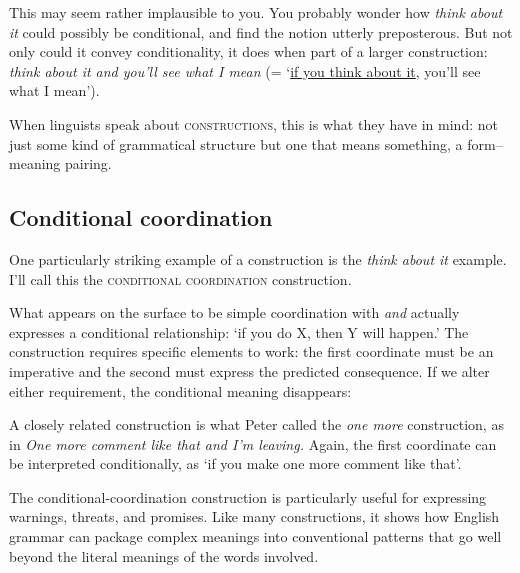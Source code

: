 This may seem rather implausible to you. You probably wonder how \textit{think about it} could possibly be conditional, and find the notion utterly preposterous. But not only could it convey conditionality, it does when part of a larger construction: \textit{think about it and you'll see what I mean} (= `\uline{if you think about it}, you'll see what I mean').

When linguists speak about \textsc{constructions}, this is what they have in mind: not just some kind of grammatical structure but one that means something, a form--meaning pairing.

\subsection{Conditional coordination}\label{sec:conditional-coordination}

One particularly striking example of a construction is the \textit{think about it} example. I'll call this the \textsc{conditional coordination} construction.

\ea\label{ex:conditional-coord}
   \z
\z

What appears on the surface to be simple coordination with \textit{and} actually expresses a conditional relationship: `if you do X, then Y will happen.' The construction requires specific elements to work: the first coordinate must be an imperative and the second must express the predicted consequence. If we alter either requirement, the conditional meaning disappears:

\ea\label{ex:conditional-coord-constraints}
   \z
\z

A closely related construction is what Peter \citet{culicover1970one} called the \textit{one more} construction, as in \textit{One more comment like that and I'm leaving.} Again, the first coordinate can be interpreted conditionally, as `if you make one more comment like that'.

The conditional-coordination construction is particularly useful for expressing warnings, threats, and promises. Like many constructions, it shows how English grammar can package complex meanings into conventional patterns that go well beyond the literal meanings of the words involved.


